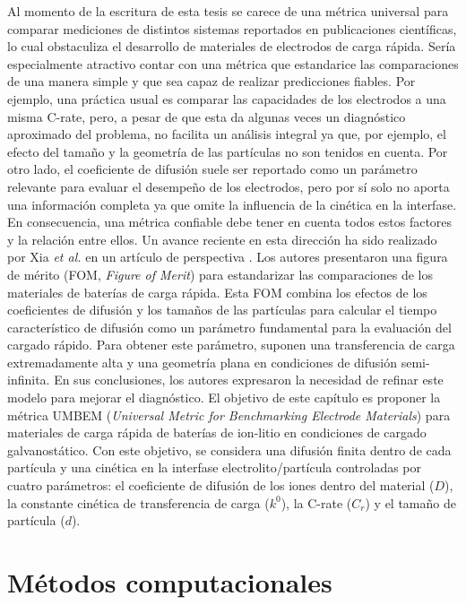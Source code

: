 Al momento de la escritura de esta tesis se carece de una métrica universal 
para comparar mediciones de distintos sistemas reportados en publicaciones
científicas, lo cual obstaculiza el desarrollo de materiales de electrodos de
carga rápida. Sería especialmente atractivo contar con una métrica que 
estandarice las comparaciones de una manera simple y que sea capaz de realizar
predicciones fiables. Por ejemplo, una práctica usual es comparar las 
capacidades de los electrodos a una misma C-rate, pero, a pesar de que esta da algunas
veces un diagnóstico aproximado del problema, no facilita un análisis 
integral ya que, por ejemplo, el efecto del tamaño y la geometría de las 
partículas no son tenidos en cuenta. Por otro lado, el coeficiente de difusión
suele ser reportado como un parámetro relevante para evaluar el desempeño de los electrodos,
pero por sí solo no aporta una información completa ya que omite la 
influencia de la cinética en la interfase. En consecuencia, una métrica confiable 
debe tener en cuenta todos estos factores y la relación entre ellos. Un avance
reciente en esta dirección ha sido realizado por Xia \textit{et al.} 
en un artículo de perspectiva \cite{xia2022}. Los autores presentaron una 
figura de mérito (FOM, \textit{Figure of Merit}) para estandarizar las 
comparaciones de los materiales de baterías de carga rápida. Esta FOM combina
los efectos de los coeficientes de difusión y los tamaños de las partículas 
para calcular el tiempo característico de difusión como un parámetro 
fundamental para la evaluación del cargado rápido. Para obtener este parámetro,
suponen una transferencia de carga extremadamente alta y una geometría plana 
en condiciones de difusión semi-infinita. En sus conclusiones, los autores 
expresaron la necesidad de refinar este modelo para mejorar el diagnóstico. 
El objetivo de este capítulo es proponer la métrica UMBEM (\textit{Universal
Metric for Benchmarking Electrode Materials}) para materiales de carga rápida
de baterías de ion-litio en condiciones de cargado galvanostático. Con este
objetivo, se considera una difusión finita dentro de cada partícula y una cinética en la interfase electrolito/partícula 
controladas por cuatro parámetros: el coeficiente de difusión de los iones 
dentro del material ($D$), la constante cinética de transferencia de carga
($k^0$), la C-rate ($C_r$) y el tamaño de partícula ($d$).


\section{Métodos computacionales}

